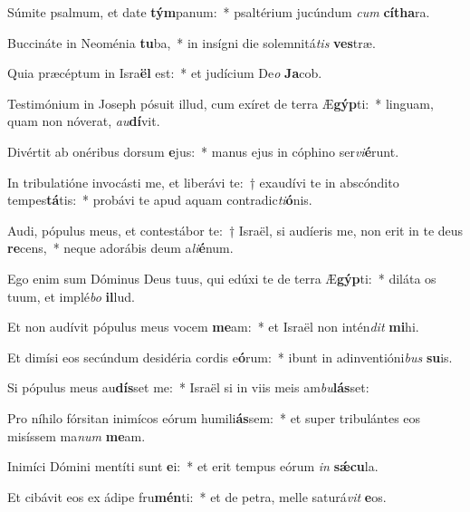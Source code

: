 \item Súmite psalmum, et date \textbf{tým}panum:~* psaltérium jucúndum \textit{cum} \textbf{cí}\textbf{tha}ra.
\item Buccináte in Neoménia \textbf{tu}ba,~* in insígni die solemnitá\textit{tis} \textbf{ves}træ.
\item Quia præcéptum in Isra\textbf{ël} est:~* et judícium De\textit{o} \textbf{Ja}cob.
\item Testimónium in Joseph pósuit illud, cum exíret de terra Æ\textbf{gýp}ti:~* linguam, quam non nóverat, \textit{au}\textbf{dí}vit.
\item Divértit ab onéribus dorsum \textbf{e}jus:~* manus ejus in cóphino ser\textit{vi}\textbf{é}runt.
\item In tribulatióne invocásti me, et liberávi te:~† exaudívi te in abscóndito tempes\textbf{tá}tis:~* probávi te apud aquam contradic\textit{ti}\textbf{ó}nis.
\item Audi, pópulus meus, et contestábor te:~† Israël, si audíeris me, non erit in te deus \textbf{re}cens,~* neque adorábis deum a\textit{li}\textbf{é}num.
\item Ego enim sum Dóminus Deus tuus, qui edúxi te de terra Æ\textbf{gýp}ti:~* diláta os tuum, et implé\textit{bo} \textbf{il}lud.
\item Et non audívit pópulus meus vocem \textbf{me}am:~* et Israël non intén\textit{dit} \textbf{mi}hi.
\item Et dimísi eos secúndum desidéria cordis e\textbf{ó}rum:~* ibunt in adinventióni\textit{bus} \textbf{su}is.
\item Si pópulus meus au\textbf{dís}set me:~* Israël si in viis meis am\textit{bu}\textbf{lás}set:
\item Pro níhilo fórsitan inimícos eórum humili\textbf{ás}sem:~* et super tribulántes eos misíssem ma\textit{num} \textbf{me}am.
\item Inimíci Dómini mentíti sunt \textbf{e}i:~* et erit tempus eórum \textit{in} \textbf{sǽ}\textbf{cu}la.
\item Et cibávit eos ex ádipe fru\textbf{mén}ti:~* et de petra, melle saturá\textit{vit} \textbf{e}os.
